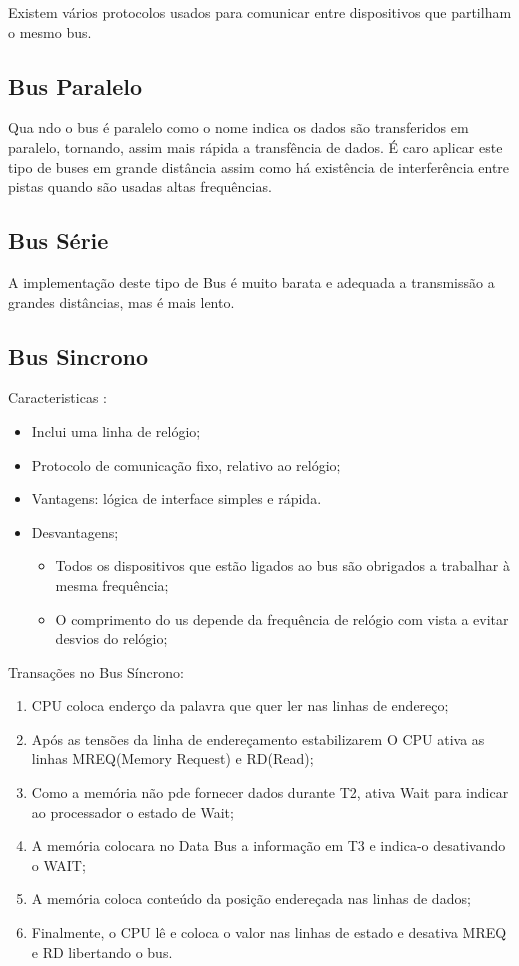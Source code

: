 \documentclass[10pt,a4paper]{paper}
\begin{document}
	Existem vários protocolos usados para comunicar entre dispositivos que partilham o mesmo bus.
	
 \subsection*{Bus Paralelo}
 
 Qua  ndo o bus é paralelo como o nome indica os dados são transferidos em paralelo, tornando, assim mais rápida a transfência de dados. É caro aplicar este tipo de buses em grande distância assim como há existência de interferência entre pistas quando são usadas altas frequências.
 
 \subsection*{Bus Série}
 
A  implementação deste tipo de Bus é muito barata e adequada a transmissão a grandes distâncias, mas é mais lento.

\subsection*{Bus Sincrono}

Caracteristicas :
\begin{itemize}
\item Inclui uma linha de relógio;
\item Protocolo de comunicação fixo, relativo ao relógio;
\item Vantagens: lógica de interface simples e rápida.
\item Desvantagens;
	\begin{itemize}
		\item Todos os dispositivos que estão ligados ao bus são obrigados a trabalhar à mesma frequência;
		\item O comprimento do us depende da frequência de relógio com vista a evitar desvios do relógio;
	\end{itemize}
\end{itemize}

\begin{flushleft}
	Transações no Bus Síncrono:
\end{flushleft}

\begin{enumerate}
	\item CPU coloca enderço da palavra que quer  ler nas linhas de endereço;
	\item Após as tensões da linha de endereçamento estabilizarem O CPU ativa as linhas MREQ(Memory Request) e RD(Read);
	\item Como a memória não pde fornecer dados durante T2, ativa Wait para indicar ao processador o estado de Wait;
	\item A memória colocara no Data Bus a informação em T3 e indica-o desativando o WAIT;
	\item A memória coloca  conteúdo da posição endereçada nas linhas de dados;
	\item Finalmente, o CPU lê e coloca o valor nas linhas de estado e desativa MREQ e RD libertando o bus.
\end{enumerate}
\end{document}
